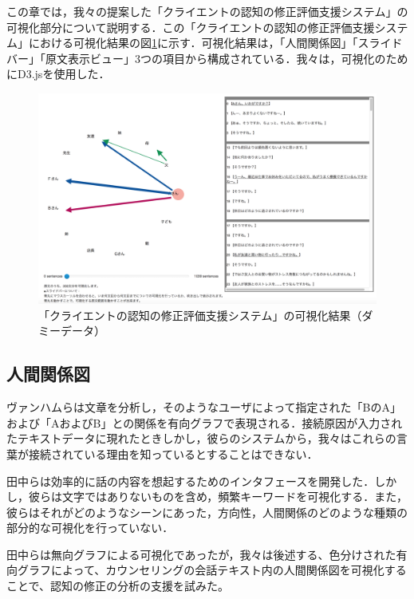 \documentclass[shuuron]{kuee}
\begin{document}
この章では，我々の提案した「クライエントの認知の修正評価支援システム」の可視化部分について説明する．この「クライエントの認知の修正評価支援システム」における可視化結果の図\ref{fig:dummyChara}に示す．可視化結果は，「人間関係図」「スライドバー」「原文表示ビュー」3つの項目から構成されている．我々は，可視化のためにD3.js\cite{vand3}を使用した．%

\begin{figure}
  \begin{center}
    \includegraphics[width=\linewidth]{dummyChara.png}
  \end{center}
  \caption{「クライエントの認知の修正評価支援システム」の可視化結果（ダミーデータ）}
  \label{fig:dummyChara}
\end{figure}

\subsection{人間関係図}

ヴァンハムら\cite{van2009mapping}は文章を分析し，そのようなユーザによって指定された「BのA」および「AおよびB」との関係を有向グラフで表現される．接続原因が入力されたテキストデータに現れたときしかし，彼らのシステムから，我々はこれらの言葉が接続されている理由を知っているとすることはできない．

田中ら\cite{tanaka}は効率的に話の内容を想起するためのインタフェースを開発した．しかし，彼らは文字ではありないものを含め，頻繁キーワードを可視化する．また，彼らはそれがどのようなシーンにあった，方向性，人間関係のどのような種類の部分的な可視化を行っていない．

田中らは無向グラフによる可視化であったが，我々は後述する、色分けされた有向グラフによって、カウンセリングの会話テキスト内の人間関係図を可視化することで、認知の修正の分析の支援を試みた。
\end{document}
